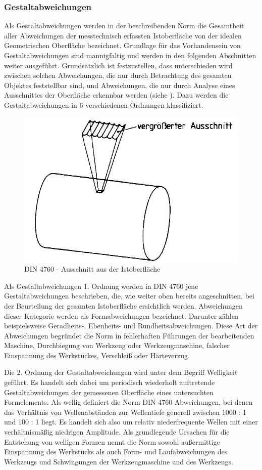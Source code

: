 \subsubsection{Gestaltabweichungen}

Als Gestaltabweichungen werden in der beschreibenden Norm die Gesamtheit aller Abweichungen der messtechnisch erfassten Istoberfläche von der idealen Geometrischen Oberfläche bezeichnet. Grundlage für das Vorhandensein von Gestaltabweichungen sind mannigfaltig und werden in den folgenden Abschnitten weiter ausgeführt. Grundsätzlich ist festzustellen, dass unterschieden wird zwischen solchen Abweichungen, die nur durch Betrachtung des gesamten Objektes feststellbar sind, und Abweichungen, die nur durch Analyse eines Ausschnittes der Oberfläche erkennbar werden (siehe ). Dazu werden die Gestaltabweichungen in 6 verschiedenen Ordnungen klassifiziert. 


\begin{figure}[h]
	\centering
	\includegraphics[width=0.3\linewidth]{img/DIN_4760_1}
	\caption[Ausschnitt aus der Istoberfläche zur Beurteilung der Gestaltabweichung]{DIN 4760 - Ausschnitt aus der Istoberfläche}
	\label{fig:din4760_1}
\end{figure}

Als Gestaltabweichungen 1. Ordnung werden in DIN 4760 jene Gestaltabweichungen beschrieben, die, wie weiter oben bereits angeschnitten, bei der Beurteilung der gesamten Istoberfläche ersichtlich werden. Abweichungen dieser Kategorie werden als Formabweichungen bezeichnet. Darunter zählen beispielsweise Geradheits-, Ebenheits- und Rundheitsabweichungen. Diese Art der Abweichungen begründet die Norm in fehlerhaften Führungen der bearbeitenden Maschine, Durchbiegung von Werkzeug oder Werkzeugmaschine, falscher Einspannung des Werkstückes, Verschleiß oder Härteverzug.

Die 2. Ordnung der Gestaltabweichungen wird unter dem Begriff Welligkeit geführt. Es handelt sich dabei um periodisch wiederholt auftretende Gestaltabweichungen der gemessenen Oberfläche eines untersuchten Formelements. Als wellig definiert die Norm DIN 4760 Abweichungen, bei denen das Verhältnis von Wellenabständen zur Wellentiefe generell zwischen 1000 : 1 und 100 : 1 liegt. Es handelt sich also um relativ niederfrequente Wellen mit einer verhältnismäßig niedrigen Amplitude. Als grundlegende Ursachen für die Entstehung von welligen Formen nennt die Norm sowohl außermittige Einspannung des Werkstücks als auch Form- und Laufabweichungen des Werkzeugs und Schwingungen der Werkzeugmaschine und des Werkzeugs.


